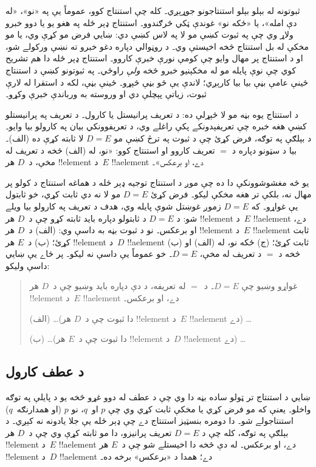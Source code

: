 \documentclass[../../../include/open-logic-section]{subfiles}
\begin{document}


ثبوتونه له بېلو بېلو استنتاجونو جوړېږي۔ کله چې استنتاج
کوو، عموماً يې په «نو»، «له دې امله»، يا «ځکه نو» غوندې
ټکي څرګندوو۔ استنتاج ډېر ځله په هغو يو يا دوو خبرو
ولاړ وي چې په ثبوت کښې مو لا په لاس کښې دي: ښايي
فرض مو کړې وي، يا مو مخکې له بل استنتاج څخه
اخيستې وي۔ د روڼوالي دپاره دغو خبرو ته نښې
ورکولے شو، او د استنتاج پر مهال وايو چې کومې
نورې خبرې کاروو۔ استنتاج ډېر ځله دا هم تشريح کوي
چې نوې پايله مو له مخکېنيو خبرو څخه \emph{ولې}
راوځي۔ په ثبوتونو کښې د استنتاج ځينې عامې بڼې
بيا بيا کارېږي؛ لاندې يې څو بڼې څېړو۔ ځينې
بڼې، لکه د استقرا له لارې ثبوت، زياتې پېچلې دي
او وروسته به ورباندې خبرې وکړو۔

د استنتاج يوه بڼه مو لا څېړلې ده: د تعريف پرانيستل
يا کارول۔ د تعريف په پرانيستلو کښې هغه خبره چې
تعريفېدونکے پکې راغلے وي، د تعريفوونکي بيان په
کارولو بيا وايو۔ د بېلګې په توګه، فرض کړئ چې
د ثبوت په ترڅ کښې مو $D = E$ لا ثابته کړې ده
(الف)۔ بيا د سټونو دپاره د $=$ تعريف کاروو
او استنتاج کوو: «نو، له (الف) څخه د تعريف له مخې،
د~$D$ هر !!{element} د~$E$ !!a{element} دے، او برعکس»۔

يو څه مغشوشوونکې دا ده چې موږ د استنتاج توجيه
ډېر ځله د هماغه استنتاج د کولو پر مهال نه،
بلکې تر هغه مخکې ليکو۔ فرض کړئ $D = E$ مو لا
نه دي ثابت کړي، خو ثابتول يې غواړو۔ که $D = E$
زموږ غوښتل شوې پايله وي، هدف د تعريف په کارولو
بيا ويلے شو: د $D = E$ د ثابتولو دپاره بايد
ثابته کړو چې د~$D$ هر !!{element} د~$E$
!!a{element} دے، او برعکس۔ نو د ثبوت بڼه به
داسې وي: (الف) د~$D$ هر !!{element} د~$E$
!!a{element} ثابت کړئ؛ (ب) د~$E$ هر
!!{element} د~$D$ !!a{element} ثابت کړئ؛
(ج) ځکه نو، له (الف) او (ب) څخه د $=$ د تعريف
له مخې، $D = E$۔ خو عموماً يې داسې نه ليکو۔
پر ځاے يې ښايي داسې وليکو:
\begin{quote}
غواړو وښيو چې $D = E$۔ د~$=$ له تعريفه، د دې
دپاره بايد وښيو چې د~$D$ هر !!{element} د~$E$
!!a{element} دے، او برعکس۔

(الف) \dots (دا ثبوت چې د~$D$ هر !!{element}
د~$E$ !!a{element} دے) \dots

(ب) \dots (دا ثبوت چې د~$E$ هر !!{element}
د~$D$ !!a{element} دے) \dots
\end{quote}

\subsection{د عطف کارول}

ښايي د استنتاج تر ټولو ساده بڼه دا وي چې د عطف
له دوو غړو څخه يو د پايلې په توګه واخلو۔ يعنې که
مو فرض کړي يا مخکې ثابت کړي وي چې $p$ او~$q$،
نو $p$ (او همدارنګه~$q$) استنتاجولے شو۔ دا
دومره بنسټيز استنتاج دے چې ډېر ځله يې جلا يادونه
نه کېږي۔ د بېلګې په توګه، کله چې د $D = E$ تعريف
پرانيزو، دا مو ثابته کړې وي چې د~$D$ هر
!!{element} د~$E$ !!a{element} دے، او برعکس۔
له دې څخه دا اخيستلے شو چې د~$E$ هر
!!{element} د~$D$ !!a{element} دے؛ همدا د
«برعکس» برخه ده۔
\end{document}
